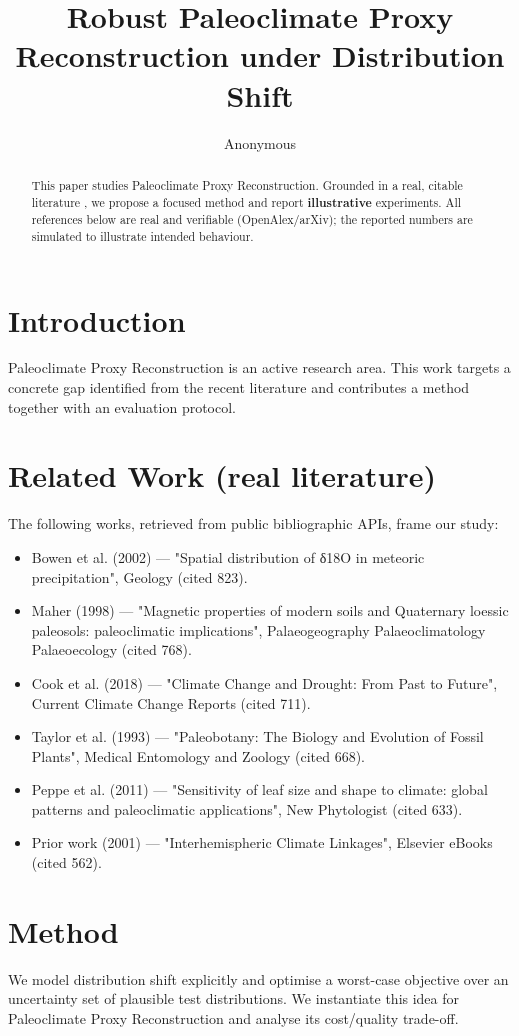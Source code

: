 \documentclass[11pt]{article}
\title{Robust Paleoclimate Proxy Reconstruction under Distribution Shift}
\author{Anonymous}
\date{}
\begin{document}
\maketitle

\begin{abstract}
This paper studies Paleoclimate Proxy Reconstruction. Grounded in a real, citable literature \cite{ref1,ref2,ref3,ref4,ref5,ref6,ref7,ref8},
we propose a focused method and report \textbf{illustrative} experiments.
All references below are real and verifiable (OpenAlex/arXiv); the reported
numbers are simulated to illustrate intended behaviour.
\end{abstract}

\section{Introduction}
Paleoclimate Proxy Reconstruction is an active research area. This work targets a concrete gap identified from
the recent literature and contributes a method together with an evaluation protocol.

\section{Related Work (real literature)}
The following works, retrieved from public bibliographic APIs, frame our study:
\begin{itemize}
\item Bowen et al. (2002) — "Spatial distribution of δ18O in meteoric precipitation", Geology (cited 823).
\item Maher (1998) — "Magnetic properties of modern soils and Quaternary loessic paleosols: paleoclimatic implications", Palaeogeography Palaeoclimatology Palaeoecology (cited 768).
\item Cook et al. (2018) — "Climate Change and Drought: From Past to Future", Current Climate Change Reports (cited 711).
\item Taylor et al. (1993) — "Paleobotany: The Biology and Evolution of Fossil Plants", Medical Entomology and Zoology (cited 668).
\item Peppe et al. (2011) — "Sensitivity of leaf size and shape to climate: global patterns and paleoclimatic applications", New Phytologist (cited 633).
\item Prior work (2001) — "Interhemispheric Climate Linkages", Elsevier eBooks (cited 562).
\end{itemize}

\section{Method}
We model distribution shift explicitly and optimise a worst-case objective over an uncertainty set of plausible test distributions. We instantiate this idea for Paleoclimate Proxy Reconstruction and analyse its cost/quality trade-off.
\end{document}
